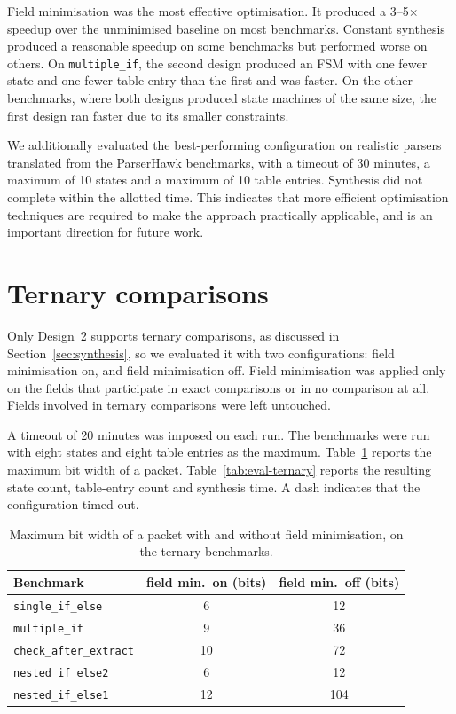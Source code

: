 Field minimisation was the most effective optimisation. It produced
a 3--5$\times$ speedup over the unminimised baseline on most
benchmarks. Constant synthesis produced a reasonable speedup on
some benchmarks but performed worse on others. On
\texttt{multiple\_if}, the second design produced an FSM with one
fewer state and one fewer table entry than the first
and was faster. On the other benchmarks, where both
designs produced state machines of the same size, the first design
ran faster due to its smaller constraints.

We additionally evaluated the best-performing configuration on
realistic parsers translated from the ParserHawk benchmarks, with
a timeout of 30 minutes, a maximum of 10 states and a maximum of
10 table entries. Synthesis did not complete within the allotted
time. This indicates that more efficient optimisation techniques
are required to make the approach practically applicable, and is
an important direction for future work.

\clearpage
\section{Ternary comparisons}
\label{sec:eval-ternary}

Only Design~2 supports ternary comparisons, as discussed in
Section~\ref{sec:synthesis}, so we evaluated it with two
configurations: field minimisation on, and field minimisation off.
Field minimisation was applied only on the fields that participate
in exact comparisons or in no comparison at all. Fields involved in
ternary comparisons were left untouched.

A timeout of 20 minutes was imposed on each run. The benchmarks
were run with eight states and eight table entries as the maximum.
Table~\ref{tab:eval-ternary-fieldsizes} reports the maximum bit width of a packet.
Table~\ref{tab:eval-ternary} reports the resulting state count,
table-entry count and synthesis time. A dash indicates that the
configuration timed out.

\begin{table}[H]
\centering
{}
\begin{tabular}{lcc}
\hline
\rowcolor{blue!20}
\textbf{Benchmark} & \textbf{field min.\ on (bits)} & \textbf{field min.\ off (bits)} \\
\hline
\texttt{single\_if\_else}      & 6  & 12  \\
\texttt{multiple\_if}          & 9  & 36  \\
\texttt{check\_after\_extract} & 10 & 72  \\
\texttt{nested\_if\_else2}     & 6  & 12  \\
\texttt{nested\_if\_else1}     & 12 & 104 \\
\hline
\end{tabular}
\caption{Maximum bit width of a packet with and without
field minimisation, on the ternary benchmarks.}
\label{tab:eval-ternary-fieldsizes}
\end{table}

